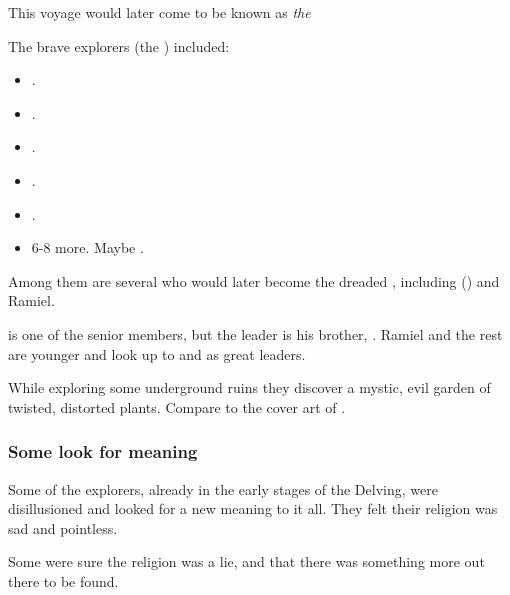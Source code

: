 This voyage would later come to be known as \emph{the \Delving}

The brave explorers (the \quo{\Delvers}) included: 

\begin{itemize}
  \item \Damiarch.
  \item \Gevural.
  \item \Zachirah.
  \item \Ramiel.
  \item \Shiaraid.
  \item 6-8 more. Maybe \Sithiyacaan.
\end{itemize}

Among them are several who would later become the dreaded \satharioth, including \Gevural{} (\Azraid{}) and Ramiel. 

\Gevural{} is one of the senior members, but the leader is his brother, \Damiarch. Ramiel and the rest are younger and look up to \Damiarch{} and \Gevural{} as great leaders. 

While exploring some underground ruins they discover a mystic, evil garden of twisted, distorted plants. 
Compare to the cover art of . 





\subsubsection{Some look for meaning}
Some of the explorers, already in the early stages of the Delving, were disillusioned and looked for a new meaning to it all. 
They felt their religion was sad and pointless. 


Some were sure the religion was a lie, and that there was something more out there to be found. 


